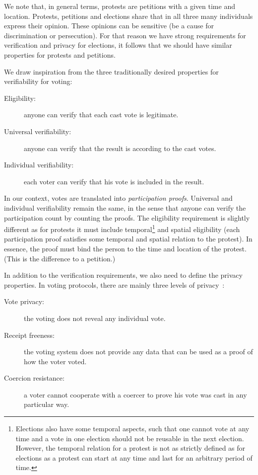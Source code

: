 We note that, in general terms, protests are petitions with a given time and 
location.
Protests, petitions and elections share that in all three many individuals 
express their opinion.
These opinions can be sensitive (\eg be a cause for discrimination or 
persecution).
For that reason we have strong requirements for verification and privacy for 
elections, it follows that we should have similar properties for protests
and petitions.

We draw inspiration from the three traditionally desired properties for verifiability for voting:
\begin{description}
  \item[Eligibility:] anyone can verify that each cast vote is legitimate.
  \item[Universal verifiability:] anyone can verify that the result is according to the cast votes.
  \item[Individual verifiability:] each voter can verify that his vote is included in the result.
\end{description}
In our context, votes are translated into \emph{participation proofs}.
Universal and individual verifiability remain the same, in the sense that anyone can verify the participation count by counting the proofs.
The eligibility requirement is slightly different as for protests it must 
include temporal\footnote{%
  Elections also have some temporal aspects, such that one cannot vote at any 
  time and a vote in one election should not be reusable in the next election.
  However, the temporal relation for a protest is not as strictly defined as for 
  elections as a protest can start at any time and last for an arbitrary period 
  of time.%
} and spatial eligibility (\ie each participation proof satisfies some temporal 
and spatial relation to the protest).
In essence, the proof must bind the person to the time and location of the protest.
(This is the difference to a petition.)

In addition to the verification requirements, we also need to define the 
privacy properties.
In voting protocols, there are mainly three levels of privacy~\cite{VerifyingPrivacyPropertiesOfVotingProtocols}:
\begin{description}
  \item[Vote privacy:] the voting does not reveal any individual vote.
  \item[Receipt freeness:] the voting system does not provide any data that can be used as a proof of how the voter voted.
  \item[Coercion resistance:] a voter cannot cooperate with a coercer to prove his vote was cast in any particular way.
\end{description}

